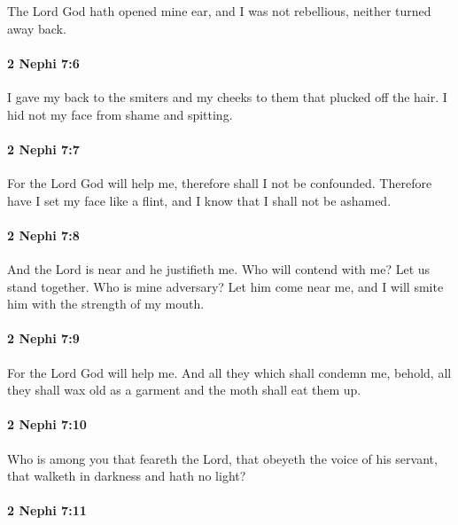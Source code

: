 			The Lord God hath opened mine ear,
			and I was not rebellious, neither turned away back.

		\paragraph{2 Nephi 7:6} %
			\label{2NEPHI-7-6}

			I gave my back to the smiters
			and my cheeks to them that plucked off the hair.
			I hid not my face from shame and spitting.

		\paragraph{2 Nephi 7:7} %
			\label{2NEPHI-7-7}

			For the Lord God will help me,
			therefore shall I not be confounded.
			Therefore have I set my face like a flint,
			and I know that I shall not be ashamed.

		\paragraph{2 Nephi 7:8} %
			\label{2NEPHI-7-8}

			And the Lord is near and he justifieth me.
			Who will contend with me?
			Let us stand together.
			Who is mine adversary?
			Let him come near me,
			and I will smite him with the strength of my mouth.

		\paragraph{2 Nephi 7:9} %
			\label{2NEPHI-7-9}

			For the Lord God will help me.
			And all they which shall condemn me,
			behold, all they shall wax old as a garment
			and the moth shall eat them up.

		\paragraph{2 Nephi 7:10} %
			\label{2NEPHI-7-10}

			Who is among you that feareth the Lord,
			that obeyeth the voice of his servant,
			that walketh in darkness and hath no light?

		\paragraph{2 Nephi 7:11} %
			\label{2NEPHI-7-11}

